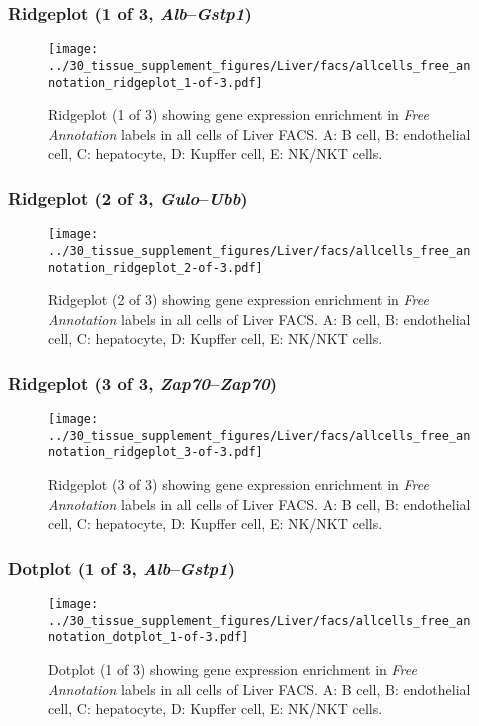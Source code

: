 \clearpage

\subsubsection{Ridgeplot (1 of 3, \emph{Alb}--\emph{Gstp1})}
\begin{figure}[h]
\centering
\texttt{[image: ../30\_tissue\_supplement\_figures/Liver/facs/allcells\_free\_annotation\_ridgeplot\_1-of-3.pdf]}

\caption{ Ridgeplot (1 of 3)  showing gene expression enrichment in \emph{Free Annotation} labels in all cells of Liver FACS. A: B cell, B: endothelial cell, C: hepatocyte, D: Kupffer cell, E: NK/NKT cells.}
\end{figure}


\clearpage

\subsubsection{Ridgeplot (2 of 3, \emph{Gulo}--\emph{Ubb})}
\begin{figure}[h]
\centering
\texttt{[image: ../30\_tissue\_supplement\_figures/Liver/facs/allcells\_free\_annotation\_ridgeplot\_2-of-3.pdf]}

\caption{ Ridgeplot (2 of 3)  showing gene expression enrichment in \emph{Free Annotation} labels in all cells of Liver FACS. A: B cell, B: endothelial cell, C: hepatocyte, D: Kupffer cell, E: NK/NKT cells.}
\end{figure}


\clearpage

\subsubsection{Ridgeplot (3 of 3, \emph{Zap70}--\emph{Zap70})}
\begin{figure}[h]
\centering
\texttt{[image: ../30\_tissue\_supplement\_figures/Liver/facs/allcells\_free\_annotation\_ridgeplot\_3-of-3.pdf]}

\caption{ Ridgeplot (3 of 3)  showing gene expression enrichment in \emph{Free Annotation} labels in all cells of Liver FACS. A: B cell, B: endothelial cell, C: hepatocyte, D: Kupffer cell, E: NK/NKT cells.}
\end{figure}


\clearpage

\subsubsection{Dotplot (1 of 3, \emph{Alb}--\emph{Gstp1})}
\begin{figure}[h]
\centering
\texttt{[image: ../30\_tissue\_supplement\_figures/Liver/facs/allcells\_free\_annotation\_dotplot\_1-of-3.pdf]}

\caption{ Dotplot (1 of 3)  showing gene expression enrichment in \emph{Free Annotation} labels in all cells of Liver FACS. A: B cell, B: endothelial cell, C: hepatocyte, D: Kupffer cell, E: NK/NKT cells.}
\end{figure}


